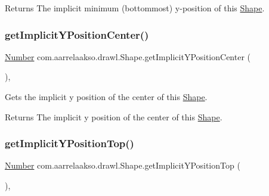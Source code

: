 \begin{DoxyReturn}{Returns}
The implicit minimum (bottommost) y-\/position of this \hyperlink{classcom_1_1aarrelaakso_1_1drawl_1_1_shape}{Shape}. 
\end{DoxyReturn}
\mbox{\label{classcom_1_1aarrelaakso_1_1drawl_1_1_shape_a1f27f0adc1716dc60691a7d0c14f2ace}} 
\subsubsection{\texorpdfstring{get\+Implicit\+Y\+Position\+Center()}{getImplicitYPositionCenter()}}
{\footnotesize\ttfamily \hyperlink{interfacecom_1_1aarrelaakso_1_1drawl_1_1_number}{Number} com.\+aarrelaakso.\+drawl.\+Shape.\+get\+Implicit\+Y\+Position\+Center (\begin{DoxyParamCaption}{ }\end{DoxyParamCaption})\hspace{0.3cm}{\ttfamily [protected]}, {\ttfamily [inherited]}}



Gets the implicit y position of the center of this \hyperlink{classcom_1_1aarrelaakso_1_1drawl_1_1_shape}{Shape}. 

\begin{DoxyReturn}{Returns}
The implicit y position of the center of this \hyperlink{classcom_1_1aarrelaakso_1_1drawl_1_1_shape}{Shape}. 
\end{DoxyReturn}
\mbox{\label{classcom_1_1aarrelaakso_1_1drawl_1_1_shape_a6a52176302dd9b5d2bfc2d25409c310e}} 
\subsubsection{\texorpdfstring{get\+Implicit\+Y\+Position\+Top()}{getImplicitYPositionTop()}}
{\footnotesize\ttfamily \hyperlink{interfacecom_1_1aarrelaakso_1_1drawl_1_1_number}{Number} com.\+aarrelaakso.\+drawl.\+Shape.\+get\+Implicit\+Y\+Position\+Top (\begin{DoxyParamCaption}{ }\end{DoxyParamCaption})\hspace{0.3cm}{\ttfamily [protected]}, {\ttfamily [inherited]}}



